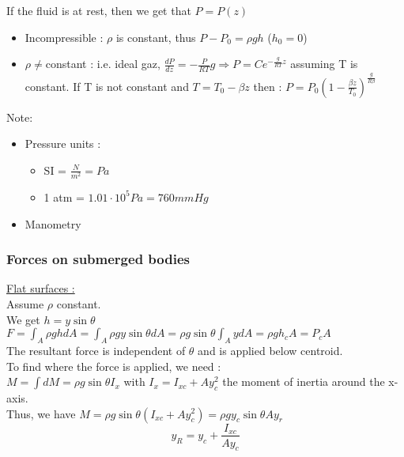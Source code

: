 \documentclass[../main.tex]{subfiles}
\begin{document}
If the fluid is at rest, then we get that $P=P(z)$\\
\begin{itemize}
    \item Incompressible : $\rho$ is constant, thus $P-P_0 = \rho g h$ ($h_0 = 0$)\\
    \item $\rho \neq$constant : i.e. ideal gaz, $\frac{dP}{dz} = -\frac{P}{RT}g \Rightarrow P = Ce^{-\frac{g}{RT}z}$ assuming T is constant. If T is not constant and $T = T_0 - \beta z$ then : $P=P_0(1-\frac{\beta z}{T_0})^{\frac{g}{R\beta}}$\\
\end{itemize}

\color{gray}Note: \begin{itemize}
    \item Pressure units : \begin{itemize}
        \item SI = $\frac{N}{m^2}=Pa$\\
        \item 1 atm = $1.01\cdot 10^5Pa = 760mmHg$\\
    \end{itemize}
    \item Manometry\\
\end{itemize}
\color{black}

\subsubsection{Forces on submerged bodies}
\quad \underline{Flat surfaces :}\\
Assume $\rho$ constant.\\
We get $h=y\sin{\theta}$\\
$F = \int_A \rho g h dA = \int_A \rho g y \sin{\theta}dA = \rho g \sin{\theta} \int_A ydA = \rho g h_c A = P_cA$\\
The resultant force is independent of $\theta$ and is applied below centroid.\\

To find where the force is applied, we need :\\
$M = \int dM = \rho g \sin{\theta} I_x$ with $I_x = I_{xc}+Ay_c^2$ the moment of inertia around the x-axis.\\
Thus, we have $M = \rho g \sin{\theta} (I_{xc}+Ay_c^2) = \rho g y_c \sin{\theta}Ay_r$\\
\begin{equation}
    y_R = y_c+\frac{I_{xc}}{Ay_c}
\end{equation}
\end{document}
